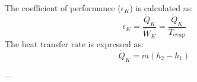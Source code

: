 The coefficient of performance (\( \epsilon_K \)) is calculated as:  
\[
\epsilon_K = \frac{\dot{Q}_K}{\dot{W}_K} = \frac{\dot{Q}_K}{T_{\text{evap}}}
\]  
The heat transfer rate is expressed as:  
\[
\dot{Q}_K = \dot{m} (h_2 - h_1)
\]  

---
